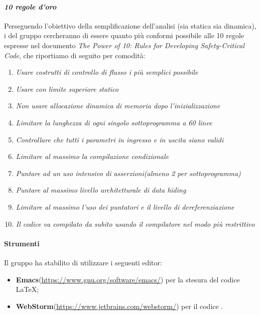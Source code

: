 		\paragraph*{\textit{10 regole d'oro}}
		Perseguendo l'obiettivo della semplificazione dell'analisi (sia statica sia dinamica),
           	i  del gruppo cercheranno di essere quanto più conformi possibile alle 10 regole
           	espresse nel documento \textit{The Power of 10: Rules for Developing Safety-Critical Code}, che riportiamo di seguito per comodità:
                	\begin{enumerate}
                        	\item \textit{Usare costrutti di controllo di flusso i più semplici possibile}
                        	\item \textit{Usare  con limite superiore statico}
                        	\item \textit{Non usare allocazione dinamica di memoria dopo l'inizializzazione}
                        	\item \textit{Limitare la lunghezza di ogni singolo sottoprogramma a 60 linee}
                        	\item \textit{Controllare che tutti i parametri in ingresso e in uscita siano validi}
                        	\item \textit{Limitare al massimo la compilazione condizionale}
                        	\item \textit{Puntare ad un uso intensivo di asserzioni(almeno 2 per sottoprogramma)}
                        	\item \textit{Puntare al massimo livello architetturale di \textit{data hiding}}
                        	\item \textit{Limitare al massimo l'uso dei puntatori e il livello di dereferenziazione}
                        	\item \textit{Il codice va compilato da subito usando il compilatore nel modo più restrittivo}
			\end{enumerate}


                \paragraph*{Strumenti}
                Il gruppo ha stabilito di utilizzare i seguenti editor:
                \begin{itemize}
                  \item \textbf{Emacs}(\url{https://www.gnu.org/software/emacs/}) per la stesura del codice \LaTeX; 
                  \item \textbf{WebStorm}(\url{https://www.jetbrains.com/webstorm/}) per il codice .
                \end{itemize}
             
